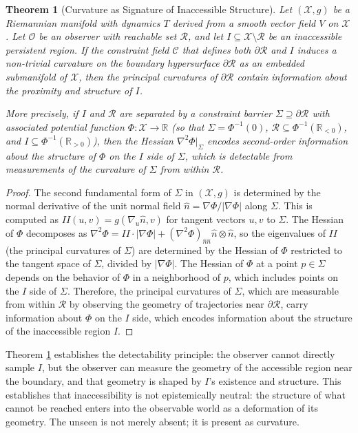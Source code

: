 \documentclass[12pt, a4paper, oneside]{article}
\theoremstyle{plain}
\newtheorem{theorem}{Theorem}[section]
\theoremstyle{definition}
\theoremstyle{remark}
\newcommand{\X}{\mathcal{X}}
\newcommand{\C}{\mathcal{C}}
\newcommand{\Obs}{\mathcal{O}}
\newcommand{\R}{\mathcal{R}}
\newcommand{\T}{T}
\begin{document}
\begin{theorem}[Curvature as Signature of Inaccessible Structure]
\label{thm:curvature}
Let $(\X, g)$ be a Riemannian manifold with dynamics $\T$ derived from a smooth vector field $V$ on $\X$. Let $\Obs$ be an observer with reachable set $\R$, and let $I \subseteq \X \setminus \R$ be an inaccessible persistent region. If the constraint field $\C$ that defines both $\partial \R$ and $I$ induces a non-trivial curvature on the boundary hypersurface $\partial \R$ as an embedded submanifold of $\X$, then the principal curvatures of $\partial \R$ contain information about the proximity and structure of $I$.

More precisely, if $I$ and $\R$ are separated by a constraint barrier $\Sigma \supseteq \partial \R$ with associated potential function $\Phi : \X \to \mathbb{R}$ (so that $\Sigma = \Phi^{-1}(0)$, $\R \subseteq \Phi^{-1}(\mathbb{R}_{<0})$, and $I \subseteq \Phi^{-1}(\mathbb{R}_{>0})$), then the Hessian $\nabla^2 \Phi|_\Sigma$ encodes second-order information about the structure of $\Phi$ on the $I$ side of $\Sigma$, which is detectable from measurements of the curvature of $\Sigma$ from within $\R$.
\end{theorem}

\begin{proof}
The second fundamental form of $\Sigma$ in $(\X, g)$ is determined by the normal derivative of the unit normal field $\hat{n} = \nabla \Phi / |\nabla \Phi|$ along $\Sigma$. This is computed as $II(u, v) = g(\nabla_u \hat{n}, v)$ for tangent vectors $u, v$ to $\Sigma$. The Hessian of $\Phi$ decomposes as $\nabla^2 \Phi = II \cdot |\nabla \Phi| + (\nabla^2 \Phi)_{\hat{n}\hat{n}} \hat{n} \otimes \hat{n}$, so the eigenvalues of $II$ (the principal curvatures of $\Sigma$) are determined by the Hessian of $\Phi$ restricted to the tangent space of $\Sigma$, divided by $|\nabla \Phi|$. The Hessian of $\Phi$ at a point $p \in \Sigma$ depends on the behavior of $\Phi$ in a neighborhood of $p$, which includes points on the $I$ side of $\Sigma$. Therefore, the principal curvatures of $\Sigma$, which are measurable from within $\R$ by observing the geometry of trajectories near $\partial \R$, carry information about $\Phi$ on the $I$ side, which encodes information about the structure of the inaccessible region $I$.
\end{proof}

Theorem \ref{thm:curvature} establishes the detectability principle: the observer cannot directly sample $I$, but the observer can measure the geometry of the accessible region near the boundary, and that geometry is shaped by $I$'s existence and structure. This establishes that inaccessibility is not epistemically neutral: the structure of what cannot be reached enters into the observable world as a deformation of its geometry. The unseen is not merely absent; it is present as curvature.
\end{document}
